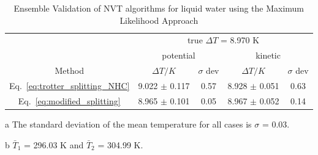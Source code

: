\documentclass[aip,jcp,reprint,amsmath,amssymb,raggedbottom]{revtex4-1}
\begin{document}

\begin{table}
	\begin{threeparttable}
		\caption{Ensemble Validation of NVT algorithms for liquid water using the Maximum Likelihood Approach  }
		\label{table:ensemblevalidation}
		\begin{ruledtabular}
			\begin{tabular}{ccccc}
				& \multicolumn{4}{c}{true $\Delta T$ = 8.970 K} \\
				\cline{2-5}
				& \multicolumn{2}{c}{potential} & \multicolumn{2}{c}{kinetic}\\
				\hline
				Method  &$\Delta T/K$ & $\sigma$ dev & $\Delta T/K$ & $\sigma$ dev \\
				\hline %
				Eq.~\ref{eq:trotter_splitting_NHC} & 9.022 $\pm$ 0.117 & 0.57 & 8.928 $\pm$ 0.051 & 0.63 \\
				Eq.~\ref{eq:modified_splitting}    & 8.965 $\pm$ 0.101 & 0.05 & 8.967 $\pm$ 0.052 & 0.14
		\end{tabular}
		\end{ruledtabular}
		\begin{tablenotes}
			\item[a] The standard deviation of the mean temperature for all cases is $\sigma$ = 0.03.
			\item[b] $\bar{T}_1$ = 296.03 K and $\bar{T}_2$ = 304.99 K.
		\end{tablenotes}
	\end{threeparttable}
\end{table}
\end{document}
